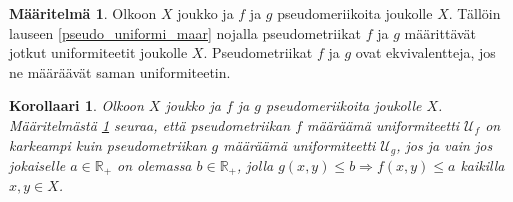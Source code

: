 \documentclass[12pt,a4paper,leqno]{report}
\newcommand{\R}{\mathbb{R}}
\newcommand{\U}{\mathcal{U}}
\theoremstyle{plain}
\newtheorem{kor}[equation]{Korollaari}
\theoremstyle{definition}
\newtheorem{maar}[equation]{Määritelmä}
\theoremstyle{remark}
\begin{document}
\begin{maar}\label{pseudo_equiv}
Olkoon $X$ joukko ja $f$ ja $g$ pseudomeriikoita joukolle $X$. 
Tällöin lauseen \ref{pseudo_uniformi_maar} nojalla 
pseudometriikat $f$ ja $g$ määrittävät jotkut uniformiteetit joukolle $X$.
Pseudometriikat $f$ ja $g$ ovat ekvivalentteja, jos ne määräävät saman uniformiteetin.
\end{maar}
\begin{kor}
Olkoon $X$ joukko ja $f$ ja $g$ pseudomeriikoita joukolle $X$. 
Määritelmästä \ref{pseudo_equiv} seuraa, että pseudometriikan $f$ määräämä uniformiteetti 
$\U_f$ 
on karkeampi kuin pseudometriikan $g$ määräämä uniformiteetti $\U_g$, jos ja vain jos jokaiselle 
$a\in\R_+$ on olemassa $b\in\R_+$, jolla $g(x,y)\leq b \Rightarrow f(x,y)\leq a$ kaikilla $x,y\in X$.
 

\end{kor}
\end{document}
